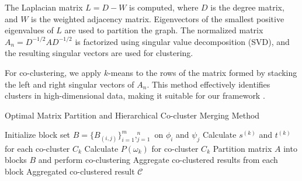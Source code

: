 \documentclass[letterpaper, 10 pt, conference]{ieeeconf}  %
\begin{document}
The Laplacian matrix $L = D - W$ is computed, where $D$ is the degree matrix, and $W$ is the weighted adjacency matrix. Eigenvectors of the smallest positive eigenvalues of $L$ are used to partition the graph. The normalized matrix $A_n = D^{-1/2} A D^{-1/2}$ is factorized using singular value decomposition (SVD), and the resulting singular vectors are used for clustering.

For co-clustering, we apply $k$-means to the rows of the matrix formed by stacking the left and right singular vectors of $A_n$. This method effectively identifies clusters in high-dimensional data, making it suitable for our framework \cite{dhillon2001CoclusteringDocumentsWords}.

\begin{algorithm}[ht]
    \caption{Optimal Matrix Partition and Hierarchical Co-cluster Merging Method}\label{alg:method}
    \begin{algorithmic}[1]
        \STATE Initialize block set $B = \{B_{(i,j)}\}_{i=1}^m,_{j=1}^n$ on $\phi_i$ and $\psi_j$
        \STATE Calculate $s^{(k)}$ and $t^{(k)}$ for each co-cluster $C_k$
        \STATE Calculate $P(\omega_k)$ for co-cluster $C_k$
        \STATE Partition matrix $A$ into blocks $B$ and perform co-clustering
        \STATE Aggregate co-clustered results from each block
        \ENDIF
        \ENDFOR
        \RETURN Aggregated co-clustered result $\mathcal{C}$
    \end{algorithmic}
\end{algorithm}
\end{document}
